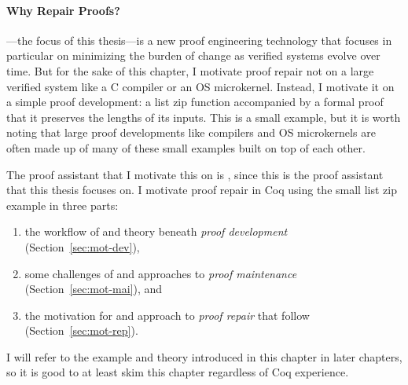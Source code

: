 \paragraph{Why Repair Proofs?}

---the focus of this thesis---is a new proof engineering technology that focuses in particular on minimizing the burden of change as verified systems evolve over time.
But for the sake of this chapter, I motivate proof repair not on a large verified system like a C compiler or an OS microkernel.
Instead, I motivate it on a simple proof development: a list zip function accompanied by a formal proof that it preserves the lengths of its inputs.
This is a small example, but it is worth noting that large proof developments like compilers and OS microkernels
are often made up of many of these small examples built on top of each other.

The proof assistant that I motivate this on is , since this is the proof assistant that this thesis focuses on.
I motivate proof repair in Coq using the small list zip example in three parts:

\begin{enumerate}
\item the workflow of and theory beneath \textit{proof development}\\
(Section~\ref{sec:mot-dev}),
\item some challenges of and approaches to \textit{proof maintenance}\\
(Section~\ref{sec:mot-mai}), and
\item the motivation for and approach to \textit{proof repair} that follow\\
(Section~\ref{sec:mot-rep}).
\end{enumerate}
I will refer to the example and theory introduced in this chapter in later chapters, so it is good to at least skim this chapter regardless of Coq experience.










